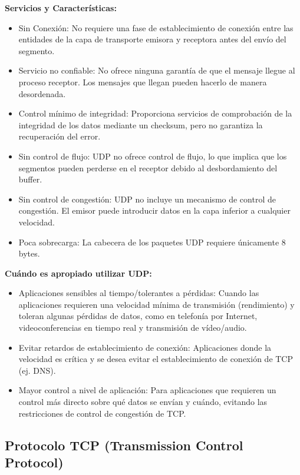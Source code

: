 \begin{enumerate}
    \textbf{Servicios y Características:}
    \begin{itemize}
        \item Sin Conexión: No requiere una fase de establecimiento de conexión entre las entidades de la capa de transporte emisora y receptora antes del envío del segmento.
        \item Servicio no confiable: No ofrece ninguna garantía de que el mensaje llegue al proceso receptor. Los mensajes que llegan pueden hacerlo de manera desordenada.
        \item Control mínimo de integridad: Proporciona servicios de comprobación de la integridad de los datos mediante un checksum, pero no garantiza la recuperación del error.
        \item Sin control de flujo: UDP no ofrece control de flujo, lo que implica que los segmentos pueden perderse en el receptor debido al desbordamiento del buffer.
        \item Sin control de congestión: UDP no incluye un mecanismo de control de congestión. El emisor puede introducir datos en la capa inferior a cualquier velocidad.
        \item Poca sobrecarga: La cabecera de los paquetes UDP requiere únicamente 8 bytes.
    \end{itemize}
    
    \textbf{Cuándo es apropiado utilizar UDP:}
    \begin{itemize}
        \item Aplicaciones sensibles al tiempo/tolerantes a pérdidas: Cuando las aplicaciones requieren una velocidad mínima de transmisión (rendimiento) y toleran algunas pérdidas de datos, como en telefonía por Internet, videoconferencias en tiempo real y transmisión de vídeo/audio.
        \item Evitar retardos de establecimiento de conexión: Aplicaciones donde la velocidad es crítica y se desea evitar el establecimiento de conexión de TCP (ej. DNS).
        \item Mayor control a nivel de aplicación: Para aplicaciones que requieren un control más directo sobre qué datos se envían y cuándo, evitando las restricciones de control de congestión de TCP.
    \end{itemize}
    
    \subsection*{Protocolo TCP (Transmission Control Protocol)}
    

\end{enumerate}
